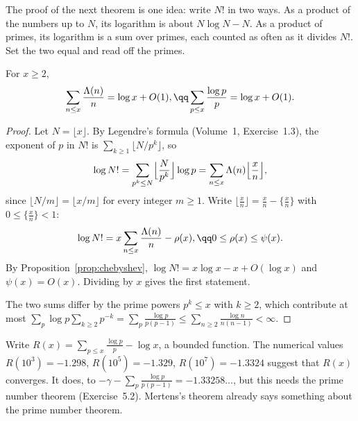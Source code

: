 The proof of the next theorem is one idea: write $N!$ in two ways. As a product of the numbers up to $N$, its logarithm is about $N\log N-N$. As a
product of primes, its logarithm is a sum over primes, each counted as often as it divides $N!$. Set the two equal and read off the primes.

\begin{theorem}[Mertens, 1874]\label{thm:mertens1}
For $x\ge2$,
\[
\begin{gathered}\sum_{n\le x}\frac{\Lambda(n)}n=\log x+O(1),\qq\sum_{p\le x}\frac{\log p}p=\log x+O(1).\end{gathered}
\]
\end{theorem}
\begin{proof}
Let $N=\lfloor x\rfloor$. By Legendre's formula (Volume~1, Exercise~1.3), the exponent of $p$ in $N!$ is $\sum_{k\ge1}\lfloor N/p^k\rfloor$, so
\[
\log N!=\sum_{p^k\le N}\Bigl\lfloor\frac N{p^k}\Bigr\rfloor\log p=\sum_{n\le x}\Lambda(n)\Bigl\lfloor\frac xn\Bigr\rfloor,
\]
since $\lfloor N/m\rfloor=\lfloor x/m\rfloor$ for every integer $m\ge1$. Write $\lfloor\frac xn\rfloor=\frac xn-\{\frac xn\}$ with $0\le\{\frac xn\}<1$:
\[
\begin{gathered}\log N!=x\sum_{n\le x}\frac{\Lambda(n)}n-\rho(x),\qq0\le\rho(x)\le\psi(x).\end{gathered}
\]
By Proposition~\ref{prop:chebyshev}, $\log N!=x\log x-x+O(\log x)$ and $\psi(x)=O(x)$. Dividing by $x$ gives the first statement.

The two sums differ by the prime powers $p^k\le x$ with $k\ge2$, which contribute at most
$\sum_p\log p\sum_{k\ge2}p^{-k}=\sum_p\frac{\log p}{p(p-1)}\le\sum_{n\ge2}\frac{\log n}{n(n-1)}<\infty$.
\end{proof}

Write $R(x)=\sum_{p\le x}\frac{\log p}p-\log x$, a bounded function. The numerical values $R(10^3)=-1.298$, $R(10^5)=-1.329$, $R(10^7)=-1.3324$
suggest that $R(x)$ converges. It does, to $-\gamma-\sum_p\frac{\log p}{p(p-1)}=-1.33258\ldots$, but this needs the prime number theorem (Exercise~5.2).
Mertens's theorem already says something about the prime number theorem.

